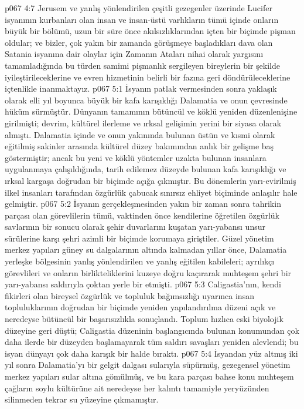\vs p067 4:7 Jerusem ve yanlış yönlendirilen çeşitli gezegenler üzerinde Lucifer isyanının kurbanları olan insan ve insan\hyp{}üstü varlıkların tümü içinde onların büyük bir bölümü, uzun bir süre önce akılsızlıklarından içten bir biçimde pişman oldular; ve bizler, çok yakın bir zamanda görüşmeye başladıkları dava olan Satania isyanına dair olaylar için Zamanın Ataları nihai olarak yargısını tamamladığında bu türden samimi pişmanlık sergileyen bireylerin bir şekilde iyileştirileceklerine ve evren hizmetinin belirli bir fazına geri döndürüleceklerine içtenlikle inanmaktayız.
\vs p067 5:1 İsyanın patlak vermesinden sonra yaklaşık olarak elli yıl boyunca büyük bir kafa karışıklığı Dalamatia ve onun çevresinde hüküm sürmüştür. Dünyanın tamamının bütüncül ve köklü yeniden düzenlenişine girilmişti; devrim, kültürel ilerleme ve ırksal gelişimin yerini bir siyasa olarak almıştı. Dalamatia içinde ve onun yakınında bulunan üstün ve kısmi olarak eğitilmiş sakinler arasında kültürel düzey bakımından anlık bir gelişme baş göstermiştir; ancak bu yeni ve köklü yöntemler uzakta bulunan insanlara uygulanmaya çalışıldığında, tarih edilemez düzeyde bulunan kafa karışıklığı ve ırksal kargaşa doğrudan bir biçimde açığa çıkmıştır. Bu dönemlerin yarı\hyp{}evirilmiş ilkel insanları tarafından özgürlük çabucak sınırsız ehliyet biçiminde anlaşılır hale gelmiştir.
\vs p067 5:2 İsyanın gerçekleşmesinden yakın bir zaman sonra tahrikin parçası olan görevlilerin tümü, vaktinden önce kendilerine öğretilen özgürlük savlarının bir sonucu olarak şehir duvarlarını kuşatan yarı\hyp{}yabansı unsur sürülerine karşı şehri azimli bir biçimde korumaya giriştiler. Güzel yönetim merkez yapıları güney su dalgalarının altında kalmadan yıllar önce, Dalamatia yerleşke bölgesinin yanlış yönlendirilen ve yanlış eğitilen kabileleri; ayrılıkçı görevlileri ve onların birlikteliklerini kuzeye doğru kaçırarak muhteşem şehri bir yarı\hyp{}yabansı saldırıyla çoktan yerle bir etmişti.
\vs p067 5:3 Caligastia’nın, kendi fikirleri olan bireysel özgürlük ve topluluk bağımsızlığı uyarınca insan topluluklarının doğrudan bir biçimde yeniden yapılandırılma düzeni açık ve neredeyse bütüncül bir başarısızlıkla sonuçlandı. Toplum hızlıca eski biyolojik düzeyine geri düştü; Caligastia düzeninin başlangıcında bulunan konumundan çok daha ilerde bir düzeyden başlamayarak tüm saldırı savaşları yeniden alevlendi; bu isyan dünyayı çok daha karışık bir halde bıraktı.
\vs p067 5:4 İsyandan yüz altmış iki yıl sonra Dalamatia’yı bir gelgit dalgası sularıyla süpürmüş, gezegensel yönetim merkez yapıları sular altına gömülmüş, ve bu kara parçası bahse konu muhteşem çağların soylu kültürüne ait neredeyse her kalıntı tamamiyle yeryüzünden silinmeden tekrar su yüzeyine çıkmamıştır.
